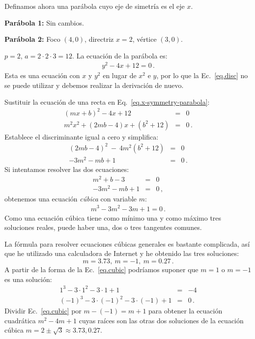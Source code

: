 \begin{example}\mbox{}

\noindent Definamos ahora una parábola cuyo eje de simetría es el eje $x$.

\noindent\textbf{Parábola 1:} Sin cambios. 

\noindent\textbf{Parábola 2:} Foco $(4,0)$, directriz $x=2$, vértice $(3,0)$.

\noindent{}$p=2$, $a=2\cdot 2\cdot 3=12$. La ecuación de la parábola es:
\begin{align}
y^2-4x+12 = 0\,.\label{eq.x-symmetry-parabola}
\end{align}
Esta es una ecuación con $x$ y $y^2$ en lugar de $x^2$ e $y$, por lo que la Ec.~\ref{eq.disc} no se puede utilizar y debemos realizar la derivación de nuevo.

Sustituir la ecuación de una recta en Eq.~\ref{eq.x-symmetry-parabola}:
\begin{eqnarray*}
(mx+b)^2-4x+12&=&0\\
m^2x^2+(2mb-4)x+(b^2+12)&=&0\,.
\end{eqnarray*}
Establece el discriminante igual a cero y simplifica:
\begin{eqnarray*}
(2mb-4)^2\:-\:4m^2(b^2+12)&=&0\\
-3m^2-mb+1&=&0\,.
\end{eqnarray*}
Si intentamos resolver las dos ecuaciones:
\begin{eqnarray*}
m^2+b-3&=&0\\
-3m^2-mb+1&=&0\,,
\end{eqnarray*}
obtenemos una ecuación \emph{cúbica} con variable $m$:
\begin{align}
m^3-3m^2-3m+1=0\,.\label{eq.cubic}
\end{align}
Como una ecuación cúbica tiene como mínimo una y como máximo tres soluciones reales, puede haber una, dos o tres tangentes comunes.

La fórmula para resolver ecuaciones cúbicas generales es bastante complicada, así que he utilizado una calculadora de Internet y he obtenido las tres soluciones:
\[m=3.73,\:m=-1,\:m=0.27\,.\]
A partir de la forma de la Ec.~\ref {eq.cubic} podríamos suponer que $m=1$ o $m=-1$ es una solución:
\begin{eqnarray*}
1^3-3\cdot 1^2-3\cdot 1+1&=&-4\\
(-1)^3-3\cdot (-1)^2-3\cdot(-1)+1&=&0\,.
\end{eqnarray*}
Dividir Ec.~\ref{eq.cubic} por $m-(-1)=m+1$ para obtener la ecuación cuadrática $m^2-4m+1$ cuyas raíces son las otras dos soluciones de la ecuación cúbica $m=2\pm\sqrt{3}\approx 3.73, 0.27$.
\end{example}

